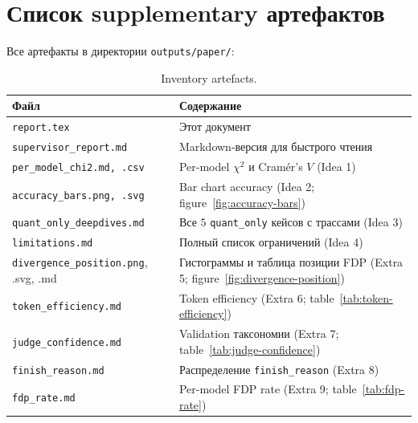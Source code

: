 \documentclass[11pt, a4paper]{article}
\newcommand{\code}[1]{\texttt{#1}}
\newcommand{\chisq}{$\chi^{2}$}
\begin{document}
\section{Список supplementary артефактов}
\label{app:artifacts}

Все артефакты в директории \code{outputs/paper/}:

\begin{table}[H]
\centering
\small
\begin{tabular}{ll}
\toprule
\textbf{Файл} & \textbf{Содержание} \\
\midrule
\code{report.tex}                  & Этот документ \\
\code{supervisor\_report.md}       & Markdown-версия для быстрого чтения \\
\code{per\_model\_chi2.md, .csv}   & Per-model \chisq{} и Cramér's $V$ (Idea 1) \\
\code{accuracy\_bars.png, .svg}    & Bar chart accuracy (Idea 2; figure~\ref{fig:accuracy-bars}) \\
\code{quant\_only\_deepdives.md}   & Все $5$ \code{quant\_only} кейсов с трассами (Idea 3) \\
\code{limitations.md}              & Полный список ограничений (Idea 4) \\
\code{divergence\_position.png}, .svg, .md & Гистограммы и таблица позиции FDP (Extra 5; figure~\ref{fig:divergence-position}) \\
\code{token\_efficiency.md}        & Token efficiency (Extra 6; table~\ref{tab:token-efficiency}) \\
\code{judge\_confidence.md}        & Validation таксономии (Extra 7; table~\ref{tab:judge-confidence}) \\
\code{finish\_reason.md}           & Распределение \code{finish\_reason} (Extra 8) \\
\code{fdp\_rate.md}                & Per-model FDP rate (Extra 9; table~\ref{tab:fdp-rate}) \\
\bottomrule
\end{tabular}
\caption{Inventory artefacts.}
\end{table}
\end{document}
